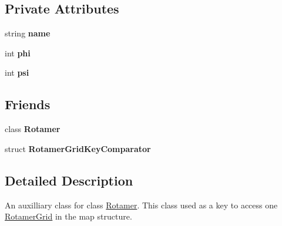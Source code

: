 \subsection*{Private Attributes}
\begin{DoxyCompactItemize}
\item 
\hypertarget{classRotamerGridKey_a2d613cdc3ef66ac31971912f8a739820}{string {\bfseries name}}\label{classRotamerGridKey_a2d613cdc3ef66ac31971912f8a739820}

\item 
\hypertarget{classRotamerGridKey_a0077bcfd515e11fb1381858f96b58d70}{int {\bfseries phi}}\label{classRotamerGridKey_a0077bcfd515e11fb1381858f96b58d70}

\item 
\hypertarget{classRotamerGridKey_ab746864738cf575c10f8d0e2cd0fc20d}{int {\bfseries psi}}\label{classRotamerGridKey_ab746864738cf575c10f8d0e2cd0fc20d}

\end{DoxyCompactItemize}
\subsection*{Friends}
\begin{DoxyCompactItemize}
\item 
\hypertarget{classRotamerGridKey_abbb5e1f6ca569c67c8a354f8698eb62e}{class {\bfseries Rotamer}}\label{classRotamerGridKey_abbb5e1f6ca569c67c8a354f8698eb62e}

\item 
\hypertarget{classRotamerGridKey_a949353fe14fa04083e8cc7121c6f7d3e}{struct {\bfseries Rotamer\-Grid\-Key\-Comparator}}\label{classRotamerGridKey_a949353fe14fa04083e8cc7121c6f7d3e}

\end{DoxyCompactItemize}


\subsection{Detailed Description}
An auxilliary class for class \hyperlink{classRotamer}{Rotamer}. This class used as a key to access one \hyperlink{classRotamerGrid}{Rotamer\-Grid} in the map structure. 

